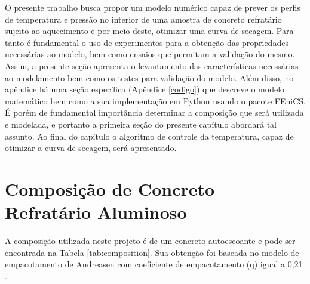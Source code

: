 O presente trabalho busca propor um modelo numérico capaz de prever os perfis de
temperatura e pressão no interior de uma amostra de concreto refratário sujeito
ao aquecimento e por meio deste, otimizar uma curva de secagem. Para tanto é
fundamental o uso de experimentos para a obtenção das propriedades necessárias
ao modelo, bem como ensaios que permitam a validação do mesmo. Assim, a presente
seção apresenta o levantamento das características necessárias ao modelamento
bem como os testes para validação do modelo. Além disso, no apêndice há uma seção
específica (Apêndice \ref{codigo}) que descreve o modelo matemático bem como a
sua implementação em Python usando o pacote FEniCS. É porém de fundamental
importância determinar a composição que será utilizada e modelada, e portanto a
primeira seção do presente capítulo abordará tal assunto. Ao final do capítulo o
algoritmo de controle da temperatura, capaz de otimizar a curva de secagem, será
apresentado.

\section{Composição de Concreto Refratário Aluminoso}
A composição utilizada neste projeto é de um concreto autoescoante e pode ser
encontrada na Tabela \ref{tab:composition}. Sua obtenção foi baseada no modelo
de empacotamento de Andreasen com coeficiente de empacotamento (q) igual a 0,21
\cite{da2015refractory}.

